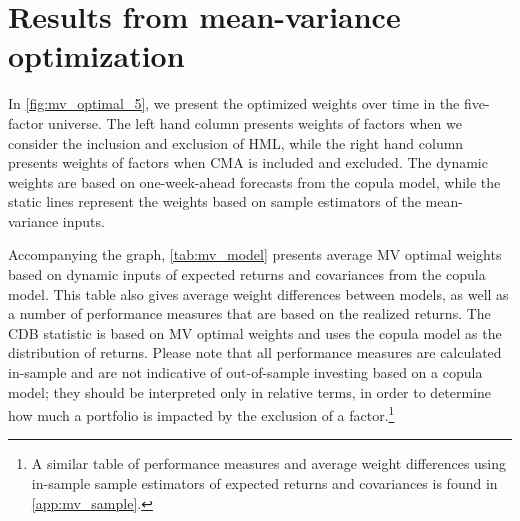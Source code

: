 
\section{Results from mean-variance optimization} %
\label{sec:mean_variance}

In \autoref{fig:mv_optimal_5}, we present the optimized weights over time in the five-factor universe. The left hand column presents weights of factors when we consider the inclusion and exclusion of HML, while the right hand column presents weights of factors when CMA is included and excluded. The dynamic weights are based on one-week-ahead forecasts from the copula model, while the static lines represent the weights based on sample estimators of the mean-variance inputs.

Accompanying the graph, \autoref{tab:mv_model} presents average MV optimal weights based on dynamic inputs of expected returns and covariances from the copula model. This table also gives average weight differences between models, as well as a number of performance measures that are based on the realized returns. The CDB statistic is based on MV optimal weights and uses the copula model as the distribution of returns. Please note that all performance measures are calculated in-sample and are not indicative of out-of-sample investing based on a copula model; they should be interpreted only in relative terms, in order to determine how much a portfolio is impacted by the exclusion of a factor.\footnote{A similar table of performance measures and average weight differences using in-sample sample estimators of expected returns and covariances is found in \autoref{app:mv_sample}.}

